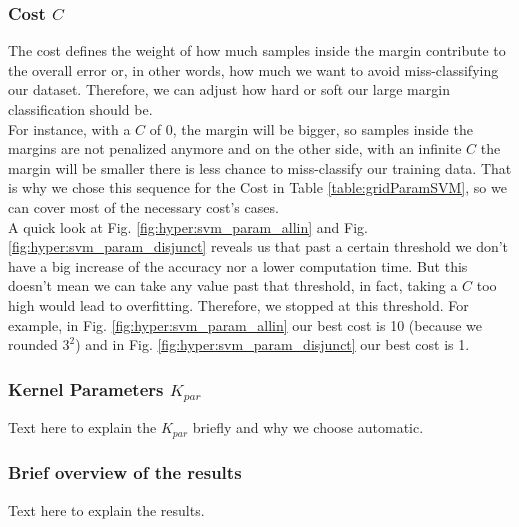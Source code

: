\documentclass[conference]{IEEEtran}
\begin{document}
{    \subsubsection{Cost $C$}
    The cost defines the weight of how much samples inside the margin contribute to the overall error or, in other words, how much we want to avoid miss-classifying our dataset. Therefore, we can adjust how hard or soft our large margin classification should be. \\
    For instance, with a $C$ of 0, the margin will be bigger, so samples inside the margins are not penalized anymore and on the other side, with an infinite $C$ the margin will be smaller there is less chance to miss-classify our training data. That is why we chose this sequence for the Cost in Table \ref{table:gridParamSVM}, so we can cover most of the necessary cost's cases.\\
    A quick look at Fig. \ref{fig:hyper:svm_param_allin} and Fig. \ref{fig:hyper:svm_param_disjunct} reveals us that past a certain threshold we don't have a big increase of the accuracy nor a lower computation time. But this doesn't mean we can take any value past that threshold, in fact, taking a $C$ too high would lead to overfitting. Therefore, we stopped at this threshold. For example, in Fig. \ref{fig:hyper:svm_param_allin} our best cost is 10 (because we rounded $3^2$) and in Fig. \ref{fig:hyper:svm_param_disjunct} our best cost is 1. \\
    \subsubsection{Kernel Parameters $K_{par}$}
    Text here to explain the $K_{par}$ briefly and why we choose automatic.\\
    \subsubsection{Brief overview of the results}
    Text here to explain the results.
}
\end{document}
